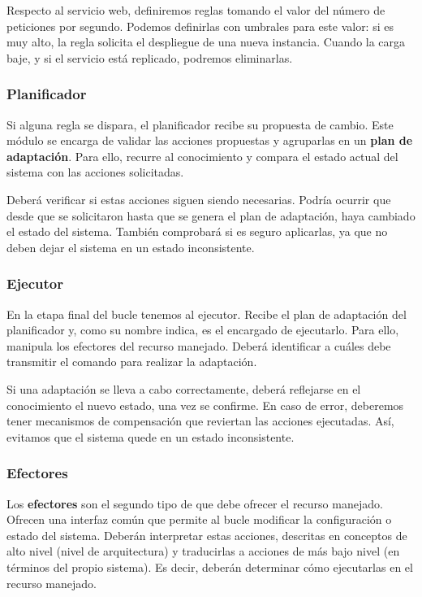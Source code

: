 Respecto al servicio web, definiremos reglas tomando el valor del número de peticiones por segundo. Podemos definirlas con umbrales para este valor: si es muy alto, la regla solicita el despliegue de una nueva instancia. Cuando la carga baje, y si el servicio está replicado, podremos eliminarlas.

\subsubsection{Planificador}

Si alguna regla se dispara, el planificador recibe su propuesta de cambio. Este módulo se encarga de validar las acciones propuestas y agruparlas en un \textbf{plan de adaptación}. Para ello, recurre al conocimiento y compara el estado actual del sistema con las acciones solicitadas.

Deberá verificar si estas acciones siguen siendo necesarias. Podría ocurrir que desde que se solicitaron hasta que se genera el plan de adaptación, haya cambiado el estado del sistema. También comprobará si es seguro aplicarlas, ya que no deben dejar el sistema en un estado inconsistente.

\subsubsection{Ejecutor}

En la etapa final del bucle tenemos al ejecutor. Recibe el plan de adaptación del planificador y, como su nombre indica, es el encargado de ejecutarlo. Para ello, manipula los efectores del recurso manejado. Deberá identificar a cuáles debe transmitir el comando para realizar la adaptación.

Si una adaptación se lleva a cabo correctamente, deberá reflejarse en el conocimiento el nuevo estado, una vez se confirme. En caso de error, deberemos tener mecanismos de compensación que reviertan las acciones ejecutadas. Así, evitamos que el sistema quede en un estado inconsistente.

\subsubsection{Efectores}

Los \textbf{efectores} son el segundo tipo de  que debe ofrecer el recurso manejado. Ofrecen una interfaz común que permite al bucle modificar la configuración o estado del sistema. Deberán interpretar estas acciones, descritas en conceptos de alto nivel (nivel de arquitectura) y traducirlas a acciones de más bajo nivel (en términos del propio sistema). \cite{garlanIncreasingSystemDependability2003} Es decir, deberán determinar cómo ejecutarlas en el recurso manejado.


